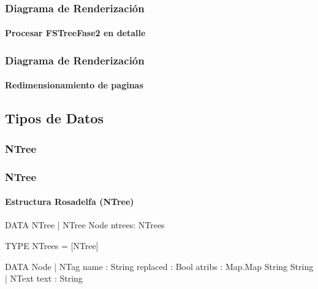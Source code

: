 \documentclass[12pt]{beamer}
\begin{document}
\begin{frame}
\frametitle{Diagrama de Renderización}
\framesubtitle{Procesar FSTreeFase2 en detalle}
\end{frame}

\begin{frame}
\frametitle{Diagrama de Renderización}
\framesubtitle{Redimensionamiento de paginas}
\end{frame}

\subsection{Tipos de Datos}

\subsubsection{NTree}
\begin{frame}[fragile]
\frametitle{NTree}
\framesubtitle{Estructura Rosadelfa (NTree)}
\begin{block}{}
\begin{ag}
DATA NTree
  | NTree Node ntrees: NTrees

TYPE NTrees = [NTree]

DATA Node
  | NTag   name     : String
           replaced : Bool
           atribs   : {Map.Map String String}
  | NText  text     : String
\end{ag}
\end{block}
\end{frame}
\end{document}
